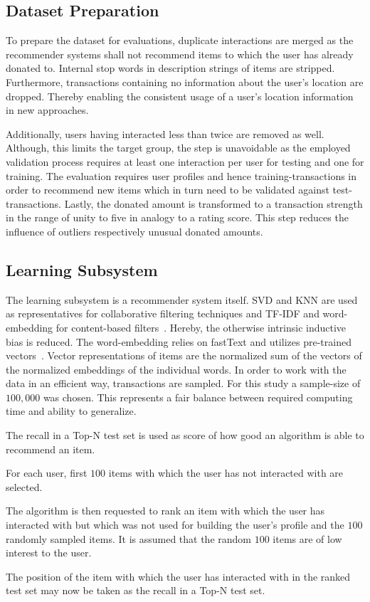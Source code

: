 \documentclass{IEEEtran}
\begin{document}
\subsection{Dataset Preparation}
To prepare the dataset for evaluations, duplicate interactions are merged as the recommender systems shall not recommend items to which the user has already donated to. Internal stop words in description strings of items are stripped. Furthermore, transactions containing no information about the user's location are dropped. Thereby enabling the consistent usage of a user's location information in new approaches.

Additionally, users having interacted less than twice are removed as well. Although, this limits the target group, the step is unavoidable as the employed validation process requires at least one interaction per user for testing and one for training. The evaluation requires user profiles and hence training-transactions in order to recommend new items which in turn need to be validated against test-transactions. Lastly, the donated amount is transformed to a transaction strength in the range of unity to five in analogy to a rating score. This step reduces the influence of outliers respectively unusual donated amounts.

\subsection{Learning Subsystem}
The learning subsystem is a recommender system itself. SVD and KNN are used as representatives for collaborative filtering techniques and TF-IDF and word-embedding for content-based filters~\cite{scikit-learn,rehurek_lrec}. Hereby, the otherwise intrinsic inductive bias is reduced. The word-embedding relies on fastText and utilizes pre-trained vectors~\cite{DBLP:journals/corr/BojanowskiGJM16}. Vector representations of items are the normalized sum of the vectors of the normalized embeddings of the individual words. In order to work with the data in an efficient way, transactions are sampled. For this study a sample-size of $100,000$ was chosen. This represents a fair balance between required computing time and ability to generalize.

The recall in a Top-N test set is used as score of how good an algorithm is able to recommend an item.
\begin{enumerate*}[label= (\arabic*)]
	\item For each user, first $100$ items with which the user has not interacted with are selected.
	\item The algorithm is then requested to rank an item with which the user has interacted with but which was not used for building the user's profile and the $100$ randomly sampled items. It is assumed that the random $100$ items are of low interest to the user.
	\item The position of the item with which the user has interacted with in the ranked test set may now be taken as the recall in a Top-N test set.
\end{enumerate*}
\end{document}
